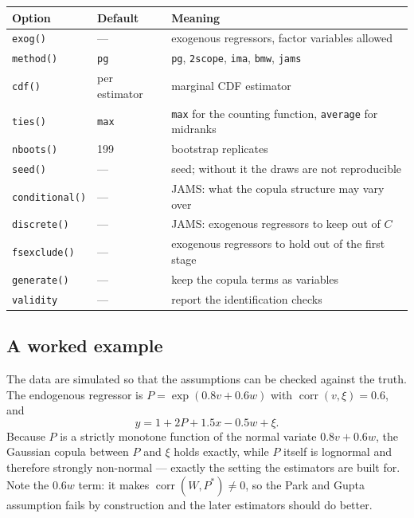 \documentclass[11pt]{article}
\newcommand{\stcmd}[1]{\texttt{#1}}
\begin{document}
\begin{center}
\small
\begin{tabular}{lll}
\toprule
Option & Default & Meaning \\
\midrule
\stcmd{exog()}        & --- & exogenous regressors, factor variables allowed \\
\stcmd{method()}      & \stcmd{pg} & \stcmd{pg}, \stcmd{2scope}, \stcmd{ima}, \stcmd{bmw}, \stcmd{jams} \\
\stcmd{cdf()}         & per estimator & marginal CDF estimator \\
\stcmd{ties()}        & \stcmd{max} & \stcmd{max} for the counting function, \stcmd{average} for midranks \\
\stcmd{nboots()}      & 199 & bootstrap replicates \\
\stcmd{seed()}        & --- & seed; without it the draws are not reproducible \\
\stcmd{conditional()} & --- & JAMS: what the copula structure may vary over \\
\stcmd{discrete()}    & --- & JAMS: exogenous regressors to keep out of $C$ \\
\stcmd{fsexclude()}   & --- & exogenous regressors to hold out of the first stage \\
\stcmd{generate()}    & --- & keep the copula terms as variables \\
\stcmd{validity}      & --- & report the identification checks \\
\bottomrule
\end{tabular}
\end{center}

\subsection{A worked example}

The data are simulated so that the assumptions can be checked against the
truth. The endogenous regressor is $P = \exp(0.8 v + 0.6 w)$ with
$\operatorname{corr}(v, \xi) = 0.6$, and
\[
y = 1 + 2P + 1.5x - 0.5w + \xi .
\]
Because $P$ is a strictly monotone function of the normal variate
$0.8v + 0.6w$, the Gaussian copula between $P$ and $\xi$ holds exactly, while
$P$ itself is lognormal and therefore strongly non-normal --- exactly the
setting the estimators are built for. Note the $0.6w$ term: it makes
$\operatorname{corr}(W, P^*) \neq 0$, so the Park and Gupta assumption fails by
construction and the later estimators should do better.
\end{document}
